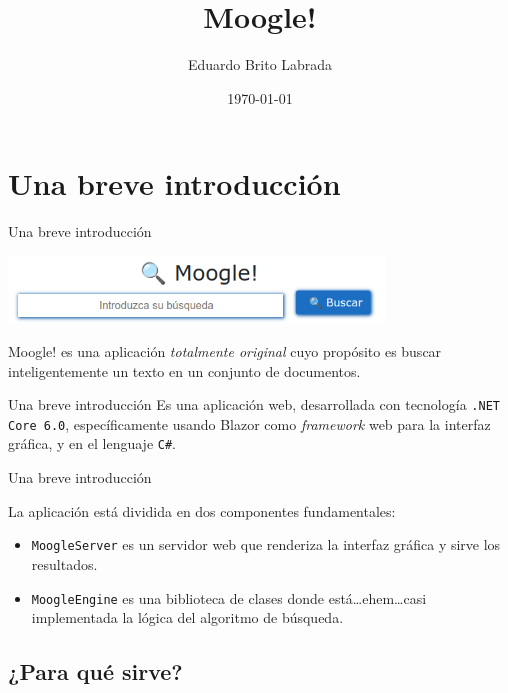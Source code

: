 \documentclass{beamer}
\title[Moogle!]{\LARGE Moogle!}
\author{Eduardo Brito Labrada}
\institute[Universidad de La Habana]
{
  Facultad de Matem\'atica y Computacin
}
\date{\today}
\begin{document}
\begin{frame}
  \maketitle
\end{frame}

\section{Una breve introducción}

\begin{frame}{Una breve introducción}
  \begin{center}
    \includegraphics[width=10cm]{images/moogle.png}
  \end{center}

  Moogle! es una aplicación {\em totalmente original} cuyo propósito es buscar
  inteligentemente un texto en un conjunto de documentos.
\end{frame}

\begin{frame}{Una breve introducción}
  Es una aplicación web, desarrollada con tecnología {\tt .NET Core 6.0}, específicamente
  usando Blazor como {\it framework} web para la interfaz gráfica, y en el
  lenguaje {\tt C\#}. \\
\end{frame}

\begin{frame}{Una breve introducción}

  La aplicación está dividida en dos componentes fundamentales:

  \begin{itemize}[<+->]
    \item {\tt MoogleServer} es un servidor web que renderiza la interfaz gráfica y sirve los resultados.
    \item {\tt MoogleEngine} es una biblioteca de clases donde está\dots ehem\dots casi implementada la lógica del algoritmo de búsqueda.
  \end{itemize}
\end{frame}

\subsection{¿Para qué sirve?}
\end{document}

